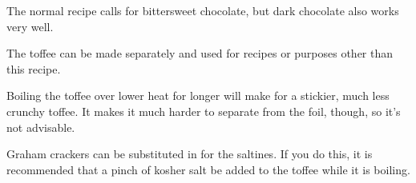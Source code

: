 \documentclass{article}
\begin{document}
\begin{notes}
\item The normal recipe calls for bittersweet chocolate, but dark chocolate also works very well.
\item The toffee can be made separately and used for recipes or purposes other than this recipe.
\item Boiling the toffee over lower heat for longer will make for a stickier, much less crunchy toffee.  It makes it much harder to separate from the foil, though, so it's not advisable.
\item Graham crackers can be substituted in for the saltines.  If you do this, it is recommended that a pinch of kosher salt be added to the toffee while it is boiling.
\end{notes}
\end{document}
